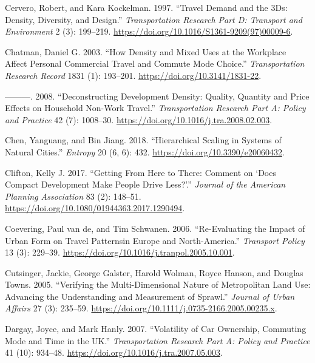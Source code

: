 \documentclass[
  12pt,
]{article}
\newlength{\cslhangindent}
\newlength{\cslentryspacingunit} %
\newenvironment{CSLReferences}[2] %
 {%
  \setlength{\parindent}{0pt}
  \ifodd #1
  \let\oldpar\par
  \def\par{\hangindent=\cslhangindent\oldpar}
  \fi
  \setlength{\parskip}{#2\cslentryspacingunit}
 }%
 {}
\begin{document}
\begin{CSLReferences}{1}{0}
\leavevmode{}%
Cervero, Robert, and Kara Kockelman. 1997. {``Travel Demand and the {3Ds}: {Density}, Diversity, and Design.''} \emph{Transportation Research Part D: Transport and Environment} 2 (3): 199--219. \url{https://doi.org/10.1016/S1361-9209(97)00009-6}.

\leavevmode{}%
Chatman, Daniel G. 2003. {``How {Density} and {Mixed Uses} at the {Workplace Affect Personal Commercial Travel} and {Commute Mode Choice}.''} \emph{Transportation Research Record} 1831 (1): 193--201. \url{https://doi.org/10.3141/1831-22}.

\leavevmode{}%
---------. 2008. {``Deconstructing Development Density: {Quality}, Quantity and Price Effects on Household Non-Work Travel.''} \emph{Transportation Research Part A: Policy and Practice} 42 (7): 1008--30. \url{https://doi.org/10.1016/j.tra.2008.02.003}.

\leavevmode{}%
Chen, Yanguang, and Bin Jiang. 2018. {``Hierarchical {Scaling} in {Systems} of {Natural Cities}.''} \emph{Entropy} 20 (6, 6): 432. \url{https://doi.org/10.3390/e20060432}.

\leavevmode{}%
Clifton, Kelly J. 2017. {``Getting {From Here} to {There}: {Comment} on {`{Does Compact Development Make People Drive Less}?'}.''} \emph{Journal of the American Planning Association} 83 (2): 148--51. \url{https://doi.org/10.1080/01944363.2017.1290494}.

\leavevmode{}%
Coevering, Paul van de, and Tim Schwanen. 2006. {``Re-Evaluating the Impact of Urban Form on Travel Patternsin {Europe} and {North-America}.''} \emph{Transport Policy} 13 (3): 229--39. \url{https://doi.org/10.1016/j.tranpol.2005.10.001}.

\leavevmode{}%
Cutsinger, Jackie, George Galster, Harold Wolman, Royce Hanson, and Douglas Towns. 2005. {``Verifying the {Multi-Dimensional Nature} of {Metropolitan Land Use}: {Advancing} the {Understanding} and {Measurement} of {Sprawl}.''} \emph{Journal of Urban Affairs} 27 (3): 235--59. \url{https://doi.org/10.1111/j.0735-2166.2005.00235.x}.

\leavevmode{}%
Dargay, Joyce, and Mark Hanly. 2007. {``Volatility of Car Ownership, Commuting Mode and Time in the {UK}.''} \emph{Transportation Research Part A: Policy and Practice} 41 (10): 934--48. \url{https://doi.org/10.1016/j.tra.2007.05.003}.


\end{CSLReferences}
\end{document}
